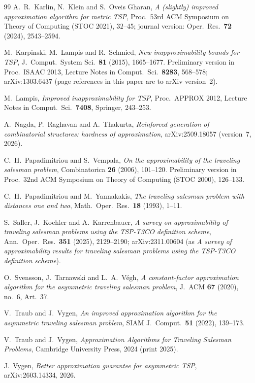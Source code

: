 \documentclass[11pt]{amsart}
\theoremstyle{definition}
\theoremstyle{remark}
\numberwithin{equation}{section}
\begin{document}
\begin{thebibliography}{99}
A.~R.~Karlin, N.~Klein and S.~Oveis Gharan,
\emph{A (slightly) improved approximation algorithm for metric {TSP}},
Proc.\ 53rd ACM Symposium on Theory of Computing (STOC 2021), 32--45;
journal version: Oper.\ Res.\ \textbf{72} (2024), 2543--2594.

M.~Karpinski, M.~Lampis and R.~Schmied,
\emph{New inapproximability bounds for {TSP}},
J.~Comput.\ System Sci.\ \textbf{81} (2015), 1665--1677.
Preliminary version in Proc.\ ISAAC 2013, Lecture Notes in Comput.\ Sci.\ \textbf{8283}, 568--578;
arXiv:1303.6437 (page references in this paper are to arXiv version~2).

M.~Lampis,
\emph{Improved inapproximability for {TSP}},
Proc.\ APPROX 2012, Lecture Notes in Comput.\ Sci.\ \textbf{7408}, Springer, 243--253.

A.~Nagda, P.~Raghavan and A.~Thakurta,
\emph{Reinforced generation of combinatorial structures: hardness of approximation},
arXiv:2509.18057 (version~7, 2026).

C.~H.~Papadimitriou and S.~Vempala,
\emph{On the approximability of the traveling salesman problem},
Combinatorica \textbf{26} (2006), 101--120.
Preliminary version in Proc.\ 32nd ACM Symposium on Theory of Computing (STOC 2000), 126--133.

C.~H.~Papadimitriou and M.~Yannakakis,
\emph{The traveling salesman problem with distances one and two},
Math.\ Oper.\ Res.\ \textbf{18} (1993), 1--11.

S.~Saller, J.~Koehler and A.~Karrenbauer,
\emph{A survey on approximability of traveling salesman problems using the {TSP-T3CO} definition scheme},
Ann.\ Oper.\ Res.\ \textbf{351} (2025), 2129--2190; arXiv:2311.00604 (as \emph{A survey of approximability results for traveling salesman problems using the {TSP-T3CO} definition scheme}).

O.~Svensson, J.~Tarnawski and L.~A.~V\'egh,
\emph{A constant-factor approximation algorithm for the asymmetric traveling salesman problem},
J.~ACM \textbf{67} (2020), no.~6, Art.~37.

V.~Traub and J.~Vygen,
\emph{An improved approximation algorithm for the asymmetric traveling salesman problem},
SIAM J.\ Comput.\ \textbf{51} (2022), 139--173.

V.~Traub and J.~Vygen,
\emph{Approximation Algorithms for Traveling Salesman Problems},
Cambridge University Press, 2024 (print 2025).

J.~Vygen,
\emph{Better approximation guarantee for asymmetric {TSP}},
arXiv:2603.14334, 2026.

\end{thebibliography}
\end{document}
